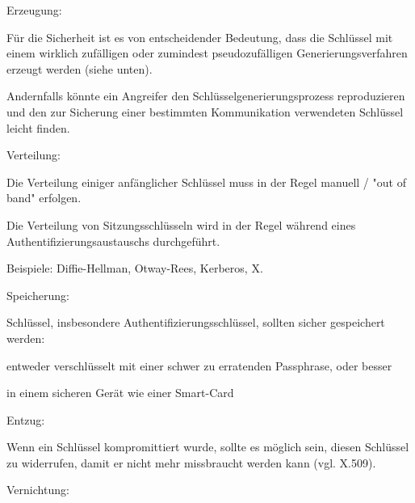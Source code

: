 \documentclass[a4paper]{article}
\begin{document}
\begin{multicols}{3}
      \begin{itemize*}
            \item Erzeugung:
            \begin{itemize*}
                  \item Für die Sicherheit ist es von entscheidender Bedeutung, dass die Schlüssel mit einem wirklich zufälligen oder zumindest pseudozufälligen Generierungsverfahren erzeugt werden (siehe unten).
                  \item Andernfalls könnte ein Angreifer den Schlüsselgenerierungsprozess reproduzieren und den zur Sicherung einer bestimmten Kommunikation verwendeten Schlüssel leicht finden.
            \end{itemize*}
            \item Verteilung:
            \begin{itemize*}
                  \item Die Verteilung einiger anfänglicher Schlüssel muss in der Regel manuell / "out of band" erfolgen.
                  \item Die Verteilung von Sitzungsschlüsseln wird in der Regel während eines Authentifizierungsaustauschs durchgeführt.
                  \item Beispiele: Diffie-Hellman, Otway-Rees, Kerberos, X.
            \end{itemize*}
            \item Speicherung:
            \begin{itemize*}
                  \item Schlüssel, insbesondere Authentifizierungsschlüssel, sollten sicher gespeichert werden:
                  \begin{itemize*} \item entweder verschlüsselt mit einer schwer zu erratenden Passphrase, oder besser \item in einem sicheren Gerät wie einer Smart-Card \end{itemize*}
            \end{itemize*}
            \item Entzug:
            \begin{itemize*}
                  \item Wenn ein Schlüssel kompromittiert wurde, sollte es möglich sein, diesen Schlüssel zu widerrufen, damit er nicht mehr missbraucht werden kann (vgl. X.509).
            \end{itemize*}
            \item Vernichtung:

\end{itemize*}
\end{multicols}
\end{document}
